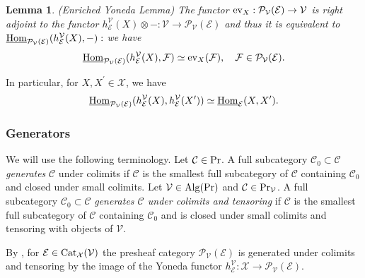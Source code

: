 \documentclass[10pt]{amsart}
\newtheorem{lemma}[equation]{Lemma}
\theoremstyle{definition}
\theoremstyle{remark}
\newcommand{\uHom}{\underline{{\rm{Hom}} }}
\newcommand{\sff}{{\mathcal{F}}}
\newcommand{\sv}{{\mathcal{V}}}
\newcommand{\scc}{{\mathcal{C}}}
\newcommand{\se}{{\mathcal{E}}}
\newcommand{\sx}{{\mathcal{X}}}
\newcommand{\spp}{{\mathcal{P}}}
\numberwithin{equation}{section}
\numberwithin{equation}{section}
\begin{document}
\begin{lemma}{\rm({\em Enriched Yoneda Lemma})} \label{enr-kol} The functor
${\rm ev}_X : \spp_{\sv}(\se) \to \sv $ is right adjoint to the functor $h^{\sv}_{\se}(X) \otimes - : \sv\to   \spp_{\sv}(\se)$  and  thus it is
equivalent to $ \uHom_{\spp_{\sv}(\se)}(h^{\sv}_{\se}(X),-):$
we have
$$\uHom_{\spp_{\sv}(\se)}(h^{\sv}_{\se}(X),\sff)\simeq   {\rm ev}_X(\sff), \quad \sff\in \spp_{\sv}(\se).$$
\end{lemma}
In particular,  for $X,X^{\prime}\in\sx$, we have 
$$\uHom_{\spp_{\sv}(\se)}(h^{\sv}_{\se}(X),h^{\sv}_{\se}(X^{\prime}))\simeq  \uHom_{\se}(X, X^{\prime}).$$
\subsubsection{Generators} We will use the following terminology. 
 Let $\scc \in  {\rm Pr}$.  A full subcategory $\scc_0\subset \scc$ {\em generates} $\scc$ under
colimits if $\scc$ is the smallest full subcategory of $\scc$ containing  $\scc_0$ and  closed under small
colimits. Let  $\sv\in  {\rm Alg}({\rm Pr}) $ and $\scc \in  {\rm Pr}_{\sv}$. A full subcategory $\scc_0 \subset  \scc$ {\em generates
$\scc$  under colimits and tensoring} if $ \scc$ is the smallest full subcategory of $ \scc $ containing 
$\scc_0 $ and is closed under small colimits and tensoring with objects of $\sv$. 
 
   By \cite[Th. 5.5]{RZ}, for $ \se \in {\rm  Cat}_{\sx}(\sv)$
the presheaf category $\spp_{\sv}(\se)$ is generated under colimits and tensoring by the image of the Yoneda functor
$h^{\sv}_{\se}:  \sx\to  \spp_{\sv}(\se).$ 
\end{document}
